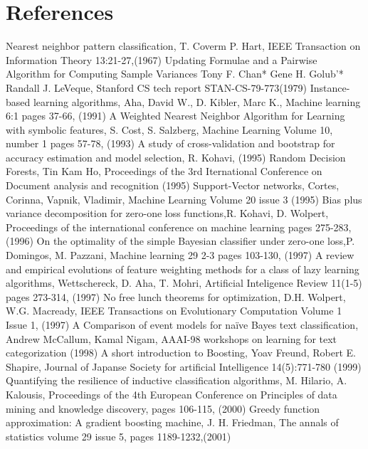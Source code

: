 \documentclass[a4paper,10pt]{article}
\begin{document}
\section{References}
\begingroup
\begin{thebibliography}{9}
 Nearest neighbor pattern classification, T. Coverm P. Hart, IEEE Transaction on Information Theory 13:21-27,(1967)
Updating Formulae and a Pairwise Algorithm for Computing Sample Variances Tony F. Chan* Gene H. Golub’* Randall J. LeVeque, Stanford CS tech report STAN-CS-79-773(1979)
 Instance-based learning algorithms, Aha, David W., D. Kibler, Marc K., Machine learning 6:1 pages 37-66, (1991)
 A Weighted Nearest Neighbor Algorithm for Learning with symbolic features, S. Cost, S. Salzberg, Machine Learning Volume 10, number 1 pages 57-78, (1993)
 A study of cross-validation and bootstrap for accuracy estimation and model selection, R. Kohavi, (1995)
 Random Decision Forests, Tin Kam Ho, Proceedings of the 3rd Iternational Conference on Document analysis and recognition (1995)
 Support-Vector networks, Cortes, Corinna, Vapnik, Vladimir, Machine Learning Volume 20 issue 3 (1995)
 Bias plus variance decomposition for zero-one loss functions,R. Kohavi, D. Wolpert, Proceedings of the international conference on machine learning pages 275-283,(1996)
 On the optimality of the simple Bayesian classifier under zero-one loss,P. Domingos, M. Pazzani, Machine learning 29 2-3 pages 103-130, (1997)
 A review and empirical evolutions of feature weighting methods for a class of lazy learning algorithms, Wettschereck, D. Aha, T. Mohri, Artificial Inteligence Review 11(1-5) pages 273-314, (1997)
 No free lunch theorems for optimization, D.H. Wolpert, W.G. Macready, IEEE Transactions on Evolutionary Computation Volume 1 Issue 1, (1997)
 A Comparison of event models for naïve Bayes text classification, Andrew McCallum, Kamal Nigam, AAAI-98 workshops on learning for text categorization (1998)
 A short introduction to Boosting, Yoav Freund, Robert E. Shapire, Journal of Japanse Society for artificial Intelligence 14(5):771-780 (1999)
 Quantifying the resilience of inductive classification algorithms, M. Hilario, A. Kalousis, 
Proceedings of the 4th European Conference on Principles of data mining and knowledge discovery, pages 106-115, (2000)
 Greedy function approximation: A gradient boosting machine, J. H. Friedman, The annals of statistics volume 29 issue 5, pages 1189-1232,(2001)

\end{thebibliography}
\end{document}
